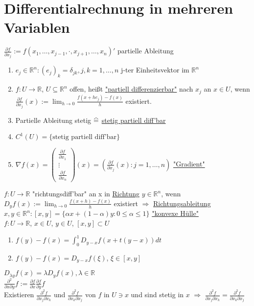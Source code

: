 \documentclass[a4paper]{article}
\renewcommand\hateq{\mathrel{\stackon[1.5pt]{=}{\stretchto{%
				\scalerel*[\widthof{=}]{\wedge}{\rule{1ex}{3ex}}}{0.5ex}}}}
\newcommand{\ul}{\underline}
\begin{document}
\section{Differentialrechnung in mehreren Variablen}
$\frac{\partial f}{\partial x_j}:=f(x_1,\dots,x_{j-1},\cdot,x_{j+1},\dots,x_n)'$ partielle Ableitung\\
\begin{enumerate}[1)]
	\item $e_j\in\mathbb{R}^n: (e_j)_k=\delta_{jk},j,k=1,\dots,n$ j-ter Einheitsvektor im $\mathbb{R}^n$
	\item $f:U\rightarrow\mathbb{R}$, $U\subseteq\mathbb{R}^n$ offen, heißt \ul{"partiell differenzierbar"} nach $x_j$ an $x\in U$, wenn $\frac{\partial f}{\partial x_j}(x):=\lim_{h\rightarrow 0} \frac{f(x+he_j)-f(x)}{h}$ existiert.
	\item Partielle Ableitung stetig $\hateq$ \ul{stetig partiell diff'bar}
	\item $C^1(U)=\{\text{stetig partiell diff'bar}\}$
	\item $\nabla f(x)=\begin{pmatrix}
	\frac{\partial f}{\partial x_1}\\
	\vdots\\
	\frac{\partial f}{\partial x_n}
	\end{pmatrix}(x)=(\frac{\partial f}{\partial x_j}(x):j=1,\dots,n)$ \ul{"Gradient"}
\end{enumerate}
$f:U\rightarrow\mathbb{R}$ "richtungsdiff'bar" an x in \ul{Richtung} $y\in\mathbb{R}^n$, wenn $D_yf(x):=\lim_{h\rightarrow 0}\frac{f(x+h)-f(x)}{h}$ existiert $\Rightarrow$ \ul{Richtungsableitung}\\
$x,y\in\mathbb{R}^n:\left[x,y\right]=\{\alpha x+(1-\alpha)y:0\leq\alpha\leq 1\}$ \ul{"konvexe Hülle"}\\
$f:U\rightarrow\mathbb{R}$, $x\in U$, $y\in U$, $\left[x,y\right]\subset U$
\begin{enumerate}[1)]
	\item $f(y)-f(x)=\int_0^1 D_{y-x}f(x+t(y-x))dt$
	\item $f(y)-f(x)=D_{y-x}f(\xi)$, $\xi\in\left[x,y\right]$
\end{enumerate}
$D_{\lambda y}f(x)=\lambda D_yf(x),\lambda\in\mathbb{R}$\\
$\frac{\partial^2}{\partial x\partial y}f:=\frac{\partial f}{\partial x}\frac{\partial f}{\partial y}f$\\
Existieren $\frac{\partial^2 f}{\partial x_j\partial x_k}$ und $\frac{\partial^2 f}{\partial x_k\partial x_j}$ von $f$ in $U\ni x$ und sind stetig in $x$ $\Rightarrow$ $\frac{\partial^2 f}{\partial x_j\partial x_k}=\frac{\partial^2 f}{\partial x_k\partial x_j}$\\
\end{document}
